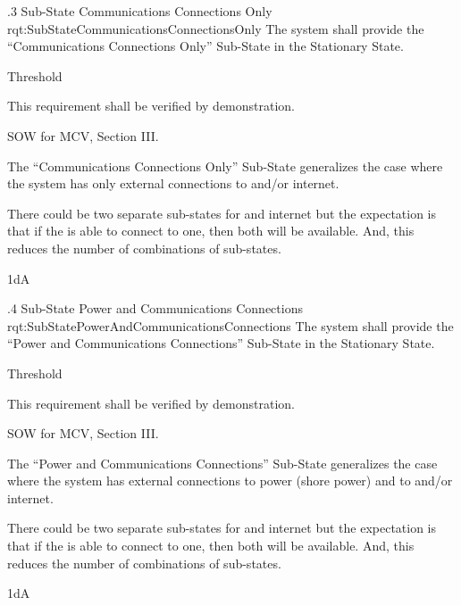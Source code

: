 \ONERQMTVKSA
{\RqtNumberBase.3}
{Sub-State Communications Connections Only}
{rqt:SubStateCommunicationsConnectionsOnly}
{The system shall provide the ``Communications Connections Only'' Sub-State in the Stationary State.}
{
	\item [Phase 1] Threshold
}
{This requirement shall be verified by demonstration.}
{
	\item [\cite{ref:MCV_SOW}] SOW for MCV, Section III.
}
{
	\item The ``Communications Connections Only'' Sub-State generalizes the case where the system has only external connections to \POTS and/or internet.
	\item There could be two separate sub-states for \POTS and internet but the expectation is that if the \ThisSys is able to connect to one, then both will be available. And, this reduces the number of combinations of sub-states.
}
{1dA}


\ONERQMTVKSA
{\RqtNumberBase.4}
{Sub-State Power and Communications Connections}
{rqt:SubStatePowerAndCommunicationsConnections}
{The system shall provide the ``Power and Communications Connections'' Sub-State in the Stationary State.}
{
	\item [Phase 1] Threshold
}
{This requirement shall be verified by demonstration.}
{
	\item [\cite{ref:MCV_SOW}] SOW for MCV, Section III.
}
{
	\item The ``Power and Communications Connections'' Sub-State generalizes the case where the system has external connections to power (shore power) and to \POTS and/or internet.
	\item There could be two separate sub-states for \POTS and internet but the expectation is that if the \ThisSys is able to connect to one, then both will be available. And, this reduces the number of combinations of sub-states.
}
{1dA}
